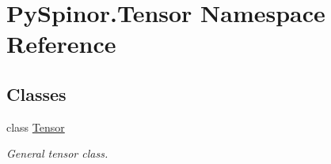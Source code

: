 \hypertarget{namespace_py_spinor_1_1_tensor}{}\section{Py\+Spinor.\+Tensor Namespace Reference}
\label{namespace_py_spinor_1_1_tensor}
\subsection*{Classes}
\begin{DoxyCompactItemize}
\item 
class \hyperlink{class_py_spinor_1_1_tensor_1_1_tensor}{Tensor}
\begin{DoxyCompactList}\small\item\em General tensor class. \end{DoxyCompactList}\end{DoxyCompactItemize}

